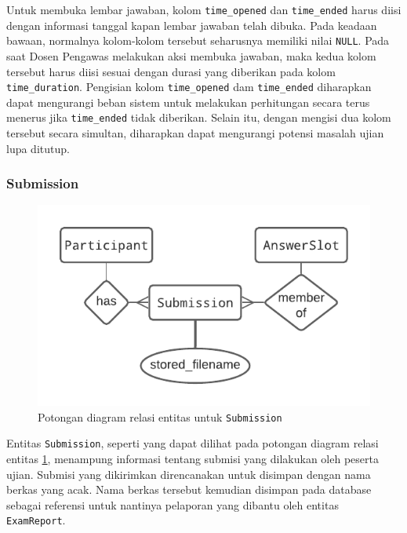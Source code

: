     Untuk membuka lembar jawaban, kolom \texttt{time\_opened} dan \texttt{time\_ended} harus diisi
    dengan informasi tanggal kapan lembar jawaban telah dibuka. Pada keadaan bawaan, normalnya
    kolom-kolom tersebut seharusnya memiliki nilai \texttt{NULL}. Pada saat Dosen Pengawas melakukan
    aksi membuka jawaban, maka kedua kolom tersebut harus diisi sesuai dengan durasi yang diberikan
    pada kolom \texttt{time\_duration}. Pengisian kolom \texttt{time\_opened} dam \texttt{time\_ended}
    diharapkan dapat mengurangi beban sistem untuk melakukan perhitungan secara terus menerus jika
    \texttt{time\_ended} tidak diberikan. Selain itu, dengan mengisi dua kolom tersebut secara
    simultan, diharapkan dapat mengurangi potensi masalah ujian lupa ditutup.
    
\subsubsection{Submission}
    
    \begin{figure}[H]
        \centering
        \includegraphics{Gambar/erd-details/ERD--New - Submission.pdf}
        \caption{Potongan diagram relasi entitas untuk \texttt{Submission}}
        \label{fig:erd_submission}
    \end{figure}

    Entitas \texttt{Submission}, seperti yang dapat dilihat pada potongan diagram relasi entitas 
    \ref{fig:erd_submission}, menampung informasi tentang submisi yang dilakukan oleh
    peserta ujian. Submisi yang dikirimkan direncanakan untuk disimpan dengan nama berkas
    yang acak. Nama berkas tersebut kemudian disimpan pada database sebagai referensi untuk nantinya
    pelaporan yang dibantu oleh entitas \texttt{ExamReport}.
    
